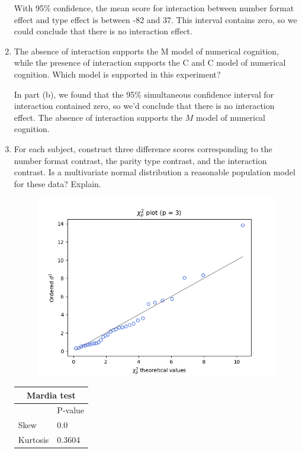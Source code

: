 \begin{enumerate}[label= (\alph*)]
    With 95\% confidence, the mean score for interaction between number format effect and type effect is between -82 and 37.
    This interval contains zero, so we could conclude that there is no interaction effect.


    \item The absence of interaction supports the M model of numerical cognition, while the
    presence of interaction supports the C and C model of numerical cognition. Which
    model is supported in this experiment?

    In part (b), we found that the 95\% simultaneous confidence interval for interaction contained zero, so we'd conclude that there is no interaction effect.
    The absence of interaction supports the $M$ model of numerical cognition.

    \item For each subject, construct three difference scores corresponding to the number format
    contrast, the parity type contrast, and the interaction contrast. Is a multivariate
    normal distribution a reasonable population model for these data? Explain.

     \begin{figure}[H]
        \centering
        \includegraphics[scale=0.70]{./python/chapter-6/Exercise-6-17-d-chi2.png}
    \end{figure}

   \begin{center}
   \begin{tabular}{|l|l|}
        \hline
        \multicolumn{2}{|c|}{Mardia test} \\
        \hline
                & P-value \\
        \hline
        Skew     & 0.0    \\
        Kurtosis & 0.3604 \\
        \hline
   \end{tabular}
   \end{center}


\end{enumerate}
